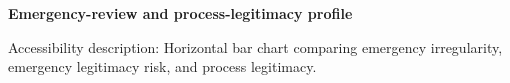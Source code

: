 \documentclass[11pt]{article}
\begin{document}
\noindent\textbf{Emergency-review and process-legitimacy profile}\par
\smallskip
\noindent
\par\smallskip
\noindent\footnotesize Accessibility description: Horizontal bar chart comparing emergency irregularity, emergency legitimacy risk, and process legitimacy.
\end{document}
